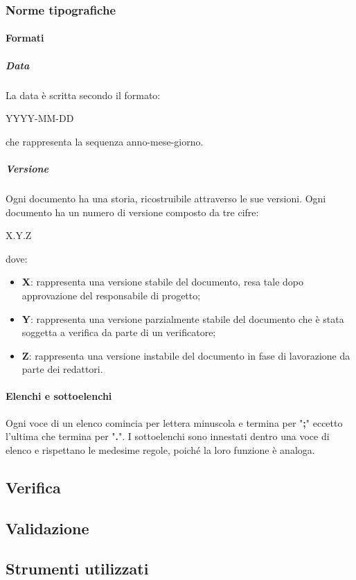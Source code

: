 		\subsubsection{Norme tipografiche}
			\paragraph{Formati}
			\subparagraph{Data}
			La data è scritta secondo il formato:\newline
			\centerline{YYYY-MM-DD}\newline
			che rappresenta la sequenza anno-mese-giorno.
			\subparagraph{Versione}
			Ogni documento ha una storia, ricostruibile attraverso le sue versioni. Ogni documento ha un numero di versione composto da tre cifre:
			\begin{center}
				X.Y.Z
			\end{center}
			dove:
			\begin{itemize}
				\item \textbf{X}: rappresenta una versione stabile del documento, resa tale dopo approvazione del responsabile di progetto;
				\item \textbf{Y}: rappresenta una versione parzialmente stabile del documento che è stata soggetta a verifica da parte di un verificatore;
				\item \textbf{Z}: rappresenta una versione instabile del documento in fase di lavorazione da parte dei redattori.
			\end{itemize}
			\paragraph{Elenchi e sottoelenchi}
			Ogni voce di un elenco comincia per lettera minuscola e termina per "\textbf{;}" eccetto l'ultima che termina per "\textbf{.}". I sottoelenchi sono innestati dentro una voce di elenco e rispettano le medesime regole, poiché la loro funzione è analoga.
			
	\subsection{Verifica}
	\subsection{Validazione}
	\subsection{Strumenti utilizzati}
	